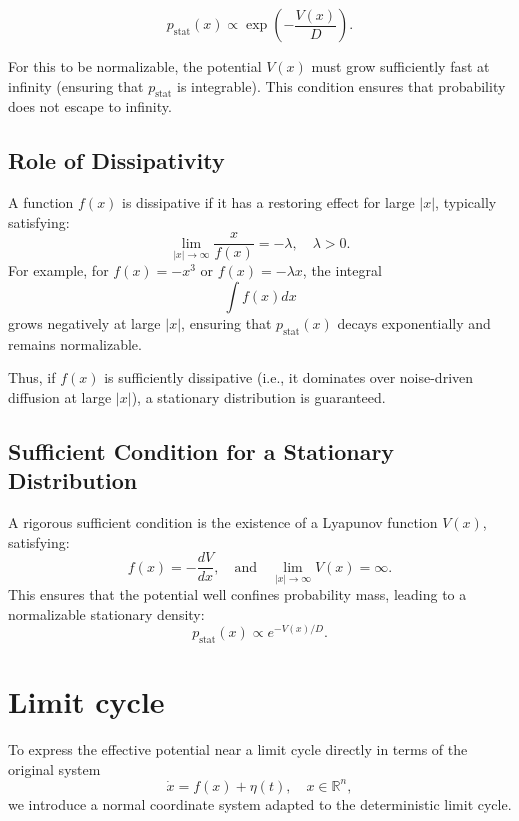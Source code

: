 \documentclass{article}
\theoremstyle{definition} \newtheorem{definition}{Definition}
\theoremstyle{remark} \newtheorem{remark}{Remark}
\newcounter{ct}
\begin{document}
\[
p_{\text{stat}}(x) \propto \exp \left( - \frac{V(x)}{D} \right).
\]

For this to be normalizable, the potential $V(x)$ must grow sufficiently fast at infinity (ensuring that $p_{\text{stat}}$ is integrable). This condition ensures that probability does not escape to infinity.


\subsection{Role of Dissipativity}
A function $f(x)$ is dissipative if it has a restoring effect for large $\vert x \vert$, typically satisfying:
\begin{equation}
    \lim_{\vert x \vert \to \infty} \frac{x}{f(x)} = -\lambda, \quad \lambda > 0.
\end{equation}
For example, for $f(x) = -x^3$ or $f(x) = -\lambda x$, the integral
\begin{equation}
    \int f(x) dx
\end{equation}
grows negatively at large $\vert x \vert$, ensuring that $p_{\text{stat}}(x)$ decays exponentially and remains normalizable.

Thus, if $f(x)$ is sufficiently dissipative (i.e., it dominates over noise-driven diffusion at large $\vert x \vert$), a stationary distribution is guaranteed.

\subsection{Sufficient Condition for a Stationary Distribution}
A rigorous sufficient condition is the existence of a Lyapunov function $V(x)$, satisfying:
\begin{equation}
    f(x) = -\frac{dV}{dx}, \quad \text{and} \quad \lim_{\vert x \vert \to \infty} V(x) = \infty.
\end{equation}
This ensures that the potential well confines probability mass, leading to a normalizable stationary density:
\begin{equation}
    p_{\text{stat}}(x) \propto e^{-V(x)/D}.
\end{equation}




\section{Limit cycle}
To express the effective potential near a limit cycle directly in terms of the original system
\begin{equation}
    \dot{x} = f(x) + \eta(t), \quad x \in \mathbb{R}^n,
\end{equation}
we introduce a normal coordinate system adapted to the deterministic limit cycle.
\end{document}
